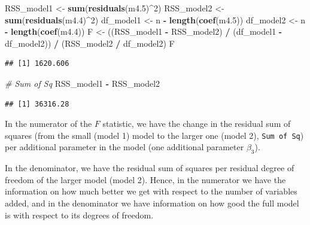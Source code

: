 \documentclass[
]{book}
\newenvironment{Shaded}{\begin{snugshade}}{\end{snugshade}}
\newcommand{\CommentTok}[1]{\textcolor[rgb]{0.56,0.35,0.01}{\textit{#1}}}
\newcommand{\DecValTok}[1]{\textcolor[rgb]{0.00,0.00,0.81}{#1}}
\newcommand{\FloatTok}[1]{\textcolor[rgb]{0.00,0.00,0.81}{#1}}
\newcommand{\FunctionTok}[1]{\textcolor[rgb]{0.13,0.29,0.53}{\textbf{#1}}}
\newcommand{\NormalTok}[1]{#1}
\newcommand{\OtherTok}[1]{\textcolor[rgb]{0.56,0.35,0.01}{#1}}
\newcommand{\SpecialCharTok}[1]{\textcolor[rgb]{0.81,0.36,0.00}{\textbf{#1}}}
\begin{document}
\begin{Shaded}
\begin{Highlighting}[]
\NormalTok{RSS\_model1 }\OtherTok{\textless{}{-}} \FunctionTok{sum}\NormalTok{(}\FunctionTok{residuals}\NormalTok{(m4}\FloatTok{.5}\NormalTok{)}\SpecialCharTok{\^{}}\DecValTok{2}\NormalTok{)}
\NormalTok{RSS\_model2 }\OtherTok{\textless{}{-}} \FunctionTok{sum}\NormalTok{(}\FunctionTok{residuals}\NormalTok{(m4}\FloatTok{.4}\NormalTok{)}\SpecialCharTok{\^{}}\DecValTok{2}\NormalTok{)}
\NormalTok{df\_model1 }\OtherTok{\textless{}{-}}\NormalTok{ n }\SpecialCharTok{{-}} \FunctionTok{length}\NormalTok{(}\FunctionTok{coef}\NormalTok{(m4}\FloatTok{.5}\NormalTok{))}
\NormalTok{df\_model2 }\OtherTok{\textless{}{-}}\NormalTok{ n }\SpecialCharTok{{-}} \FunctionTok{length}\NormalTok{(}\FunctionTok{coef}\NormalTok{(m4}\FloatTok{.4}\NormalTok{))}
\NormalTok{F }\OtherTok{\textless{}{-}}\NormalTok{ ((RSS\_model1 }\SpecialCharTok{{-}}\NormalTok{ RSS\_model2) }\SpecialCharTok{/}\NormalTok{ (df\_model1 }\SpecialCharTok{{-}}\NormalTok{ df\_model2)) }\SpecialCharTok{/}\NormalTok{ (RSS\_model2 }\SpecialCharTok{/}\NormalTok{ df\_model2)}
\NormalTok{F}
\end{Highlighting}
\end{Shaded}

\begin{verbatim}
## [1] 1620.606
\end{verbatim}

\begin{Shaded}
\begin{Highlighting}[]
\CommentTok{\# Sum of Sq}
\NormalTok{RSS\_model1 }\SpecialCharTok{{-}}\NormalTok{ RSS\_model2}
\end{Highlighting}
\end{Shaded}

\begin{verbatim}
## [1] 36316.28
\end{verbatim}

In the numerator of the \(F\) statistic, we have the change in the residual sum of squares
(from the small (model 1) model to the larger one (model 2), \texttt{Sum\ of\ Sq})
per additional parameter in the model (one additional parameter \(\beta_3\)).

In the denominator, we have the residual sum of squares per residual degree of freedom of
the larger model (model 2). Hence, in the numerator we have the information on how much
better we get with respect to the number of variables added, and in the denominator
we have information on how good the full model is with respect to its degrees of freedom.
\end{document}
